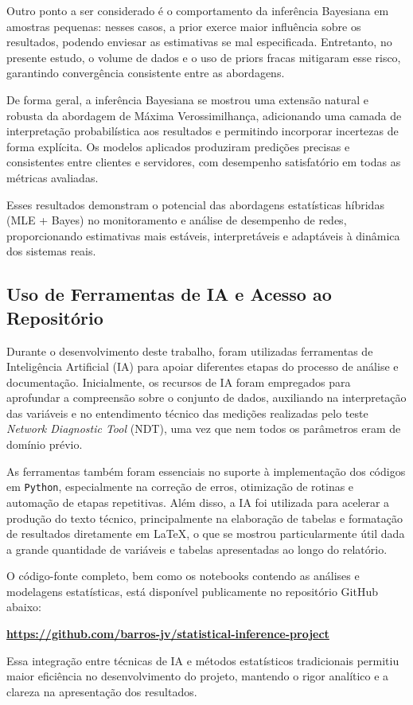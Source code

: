 \documentclass{article}
\begin{document}
Outro ponto a ser considerado é o comportamento da inferência Bayesiana em amostras pequenas:
nesses casos, a prior exerce maior influência sobre os resultados, podendo enviesar
as estimativas se mal especificada.  
Entretanto, no presente estudo, o volume de dados e o uso de priors fracas mitigaram esse risco,
garantindo convergência consistente entre as abordagens.

De forma geral, a inferência Bayesiana se mostrou uma extensão natural e robusta
da abordagem de Máxima Verossimilhança, adicionando uma camada de interpretação probabilística
aos resultados e permitindo incorporar incertezas de forma explícita.
Os modelos aplicados produziram predições precisas e consistentes entre clientes e servidores,
com desempenho satisfatório em todas as métricas avaliadas.

Esses resultados demonstram o potencial das abordagens estatísticas híbridas
(MLE + Bayes) no monitoramento e análise de desempenho de redes,
proporcionando estimativas mais estáveis, interpretáveis e adaptáveis à dinâmica
dos sistemas reais.

\subsection{Uso de Ferramentas de IA e Acesso ao Repositório}

Durante o desenvolvimento deste trabalho, foram utilizadas ferramentas de Inteligência Artificial (IA) para apoiar diferentes etapas do processo de análise e documentação. Inicialmente, os recursos de IA foram empregados para aprofundar a compreensão sobre o conjunto de dados, auxiliando na interpretação das variáveis e no entendimento técnico das medições realizadas pelo teste \textit{Network Diagnostic Tool} (NDT), uma vez que nem todos os parâmetros eram de domínio prévio.

As ferramentas também foram essenciais no suporte à implementação dos códigos em \texttt{Python}, especialmente na correção de erros, otimização de rotinas e automação de etapas repetitivas. Além disso, a IA foi utilizada para acelerar a produção do texto técnico, principalmente na elaboração de tabelas e formatação de resultados diretamente em \LaTeX, o que se mostrou particularmente útil dada a grande quantidade de variáveis e tabelas apresentadas ao longo do relatório.

O código-fonte completo, bem como os notebooks contendo as análises e modelagens estatísticas, está disponível publicamente no repositório GitHub abaixo:

\begin{center}
	\textbf{\url{https://github.com/barros-jv/statistical-inference-project}}
\end{center}

Essa integração entre técnicas de IA e métodos estatísticos tradicionais permitiu maior eficiência no desenvolvimento do projeto, mantendo o rigor analítico e a clareza na apresentação dos resultados.


\end{document}
